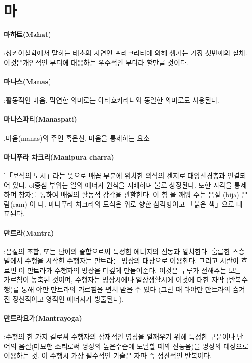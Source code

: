 \documentclass[12pt, a4paper, oneside]{book}
\let\stdsection\section
\renewcommand\section{\newpage\stdsection}
\begin{document}
\newpage
\section{마}

\paragraph{마하트(Mahat)} :상키야철학에서 말하는 태초의 자연인 프라크리티에 의해 생기는 가장 첫번째의 실체. 이것은개인적인 부디에 대응하는 우주적인 부디라 할만글 것이다.

\paragraph{마나스(Manas)} :활동적인 마음. 막연한 의미로는 아타흐카라나와 동일한 의미로도 사용된다.

\paragraph{마나스파티(Manaspati)} .마음(manas)의 주인 혹은신. 마음을 통제하는 요소

\paragraph{마니푸라 차크라(Manipura charra)}'「보석의 도시」라는 뜻으로 배꼽 부분에 위치한 의식의 센저로 태양신경총과 연결되어 있다. of중심 부위는 열의 에너지 원칙을 지배하며 불로 상징된다. 또한 시각을 통제하며 창자를 통하여 배설의 활동적 감각을 관할한다. 이 힘 을 깨워 주는 음절 (bija) 은 람(ram) 이 다. 마니푸라 차크라의 도식은 위로 향한 삼각형이고 「붉은 색」으로 대표된다.

\paragraph{만트라(Mantra)} :음절의 조합, 또는 단어의 줄합으로써 특정한 에너지의 진동과 일치한다. 훌릅한 스승밑에서 수행을 시작한 수행자는 만트라를 명상의 대상으로 이용한다. 그리고 시란이 흐르면 이 만트라가 수행자의 명상을 더깊게 만들어준다. 이것은 구루가 전해주는 모든 가르침이 농축된 것이며, 수행자는 명상시에나 일상생활시에 이것에 대한 자팍 (반복수행)를 통해 야만 만트라의 가르침을 펼쳐 받을 수 있다 (그럴 때 라야만 만트라의 숨겨진 정신적이고 영적인 에너지가 방출된다).

\paragraph{만트라요가(Mantrayoga)} :수행의 한 가지 길로써 수행자의 잠재적인 영성을 일깨우기 위해 특정한 구문이나 단어의 음절(미묘한 소리로써 명상의 높은수준에 도달할 때의 진동음)을 명상의 대상으로 이용하는 것. 이 수행시 가장 필수적인 기술은 자파 즉 정신적인 반복이다.
\end{document}
